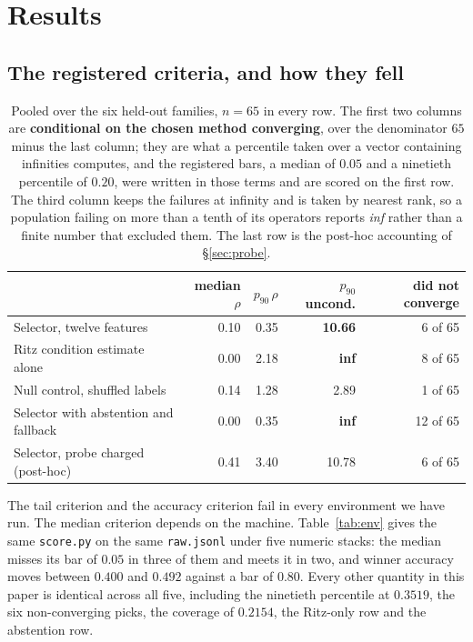 \documentclass[11pt]{article}
\begin{document}
\section{Results}

\subsection{The registered criteria, and how they fell}
\label{sec:crit}

\begin{table}[h]
\centering
\begin{tabular}{lrrrr}
\toprule
 & median $\rho$ & $p_{90}\,\rho$ & $p_{90}$ uncond. & did not converge \\
\midrule
Selector, twelve features & 0.10 & 0.35 & \textbf{10.66} & 6 of 65 \\
Ritz condition estimate alone & 0.00 & 2.18 & \textbf{inf} & 8 of 65 \\
Null control, shuffled labels & 0.14 & 1.28 & 2.89 & 1 of 65 \\
Selector with abstention and fallback & 0.00 & 0.35 & \textbf{inf} & 12 of 65 \\
\midrule
Selector, probe charged (post-hoc) & 0.41 & 3.40 & 10.78 & 6 of 65 \\
\bottomrule
\end{tabular}
\caption{Pooled over the six held-out families, $n=65$ in every row. The first two
columns are \textbf{conditional on the chosen method converging}, over the
denominator $65$ minus the last column; they are what a percentile taken over a
vector containing infinities computes, and the registered bars, a median of $0.05$
and a ninetieth percentile of $0.20$, were written in those terms and are scored on
the first row. The third column keeps the failures at infinity and is taken by
nearest rank, so a population failing on more than a tenth of its operators reports
\emph{inf} rather than a finite number that excluded them. The last row is the
post-hoc accounting of \S\ref{sec:probe}.}
\label{tab:pooled}
\end{table}

The tail criterion and the accuracy criterion fail in every environment we have run.
The median criterion depends on the machine. Table~\ref{tab:env} gives the same
\texttt{score.py} on the same \texttt{raw.jsonl} under five numeric stacks: the median
misses its bar of $0.05$ in three of them and meets it in two, and winner accuracy moves
between $0.400$ and $0.492$ against a bar of $0.80$. Every other quantity in this paper is
identical across all five, including the ninetieth percentile at $0.3519$, the six
non-converging picks, the coverage of $0.2154$, the Ritz-only row and the abstention row.
\end{document}
